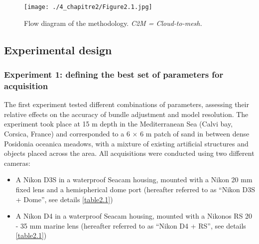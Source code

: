 \begin{figure}[htbp]
	\begin{center}
	\texttt{[image: ./4\_chapitre2/Figure2.1.jpg]}
		\caption[Flow diagram of the methodology.]{Flow diagram of the methodology. \textit{C2M = Cloud-to-mesh.}}
	\label{figure2.1}
	
\end{center}
\end{figure}

\subsection{Experimental design}\label{chapitre2_2.1}

\subsubsection{Experiment 1: defining the best set of parameters for acquisition}\label{chapitre2_2.1.1}

The first experiment tested different combinations of parameters, assessing their relative effects on the accuracy of bundle adjustment and model resolution. The experiment took place at 15 m depth in the Mediterranean Sea (Calvi bay, Corsica, France) and corresponded to a 6 $\times$ 6 m patch of sand in between dense Posidonia oceanica meadows, with a mixture of existing artificial structures and objects placed across the area. All acquisitions were conducted using two different cameras: 

\begin{itemize}[leftmargin=*]
    \item A Nikon D3S in a waterproof Seacam housing, mounted with a Nikon 20 mm fixed lens and a hemispherical dome port (hereafter referred to as “Nikon D3S + Dome”, see details \autoref{table2.1})
    \item A Nikon D4 in a waterproof Seacam housing, mounted with a Nikonos RS 20 - 35 mm marine lens (hereafter referred to as “Nikon D4 + RS”, see details \autoref{table2.1})
\end{itemize}


